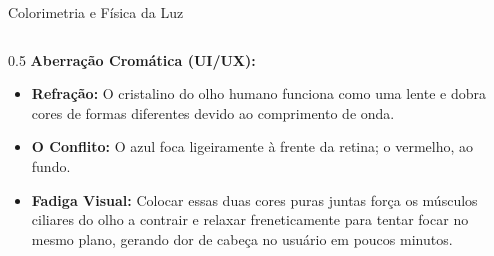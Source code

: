 \begin{frame}{Colorimetria e Física da Luz}
{\begin{columns}[T]
            \begin{column}{0.5\textwidth}    
                \scriptsize
                \textbf{Aberração Cromática (UI/UX):}
                \begin{itemize}
                    \item \textbf{Refração:} O cristalino do olho humano funciona como uma lente e dobra cores de formas diferentes devido ao comprimento de onda.
                    \item \textbf{O Conflito:} O azul foca ligeiramente à frente da retina; o vermelho, ao fundo. 
                    \item \textbf{Fadiga Visual:} Colocar essas duas cores puras juntas força os músculos ciliares do olho a contrair e relaxar freneticamente para tentar focar no mesmo plano, gerando dor de cabeça no usuário em poucos minutos.
                \end{itemize}
            \end{column}
        \end{columns}
    }
\end{frame}